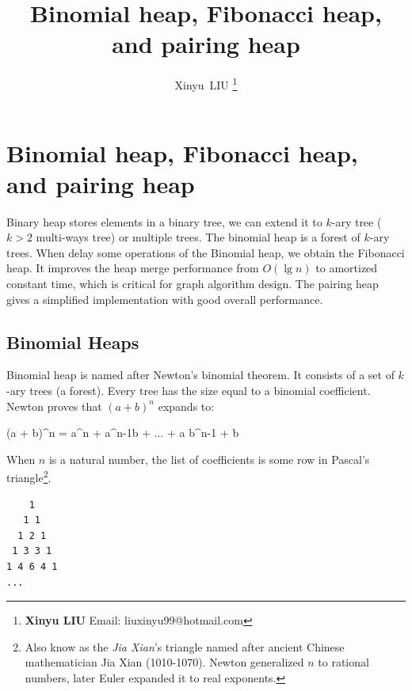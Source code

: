 \documentclass[b5paper]{article}
\begin{document}
\title{Binomial heap, Fibonacci heap, and pairing heap}

\author{Xinyu~LIU
\thanks{{\bfseries Xinyu LIU} \newline
  Email: liuxinyu99@hotmail.com \newline}
  }

\maketitle
\fi


\ifx\wholebook\relax
\chapter{Binomial heap, Fibonacci heap, and pairing heap}
\fi

Binary heap stores elements in a binary tree, we can extend it to $k$-ary tree\cite{K-ary-tree} ($k > 2$ multi-ways tree) or multiple trees. The binomial heap is a forest of $k$-ary trees. When delay some operations of the Binomial heap, we obtain the Fibonacci heap. It improves the heap merge performance from $O(\lg n)$ to amortized constant time, which is critical for graph algorithm design. The pairing heap gives a simplified implementation with good overall performance.

\section{Binomial Heaps}
\label{sec:binomial-heap} 

Binomial heap is named after Newton's binomial theorem. It consists of a set of $k$-ary trees (a forest). Every tree has the size equal to a binomial coefficient. Newton proves that $(a + b)^n$ expands to:

\be
(a + b)^n = a^n +  a^{n-1}b + ... +  a b^{n-1} + b
\ee

When $n$ is a natural number, the list of coefficients is some row in Pascal's triangle\footnote{Also know as the {\em Jia Xian}'s triangle named after ancient Chinese mathematician Jia Xian (1010-1070). Newton generalized $n$ to rational numbers, later Euler expanded it to real exponents.}\cite{wiki-pascal-triangle}.

\begin{center}
\begin{BVerbatim}
    1
   1 1
  1 2 1
 1 3 3 1
1 4 6 4 1
...
\end{BVerbatim}
\end{center}
\end{document}
